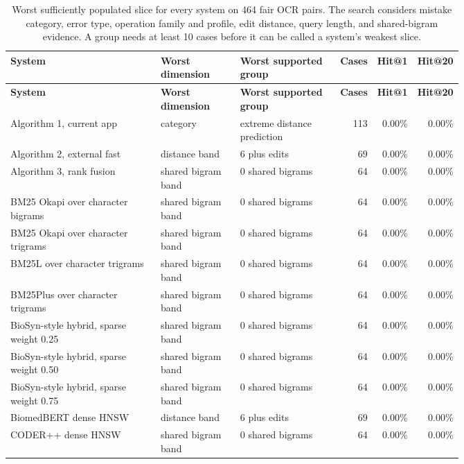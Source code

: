 \begin{scriptsize}
\setlength{\tabcolsep}{1.5pt}
\renewcommand{\arraystretch}{1.05}
\begin{longtable}{@{}L{0.35\linewidth}L{0.18\linewidth}L{0.23\linewidth}rrr@{}}
\caption{Worst sufficiently populated slice for every system on 464 fair OCR pairs. The search considers mistake category, error type, operation family and profile, edit distance, query length, and shared-bigram evidence. A group needs at least 10 cases before it can be called a system's weakest slice.}\label{tab:expanded-ocr-weakest-slice}\\
\toprule
\textbf{System} & \textbf{Worst dimension} & \textbf{Worst supported group} & \textbf{Cases} & \textbf{Hit@1} & \textbf{Hit@20} \\
\midrule
\endfirsthead
\toprule
\textbf{System} & \textbf{Worst dimension} & \textbf{Worst supported group} & \textbf{Cases} & \textbf{Hit@1} & \textbf{Hit@20} \\
\midrule
\endhead
Algorithm 1, current app & category & extreme distance prediction & 113 & 0.00\% & 0.00\% \\
Algorithm 2, external fast & distance band & 6 plus edits & 69 & 0.00\% & 0.00\% \\
Algorithm 3, rank fusion & shared bigram band & 0 shared bigrams & 64 & 0.00\% & 0.00\% \\
BM25 Okapi over character bigrams & shared bigram band & 0 shared bigrams & 64 & 0.00\% & 0.00\% \\
BM25 Okapi over character trigrams & shared bigram band & 0 shared bigrams & 64 & 0.00\% & 0.00\% \\
BM25L over character trigrams & shared bigram band & 0 shared bigrams & 64 & 0.00\% & 0.00\% \\
BM25Plus over character trigrams & shared bigram band & 0 shared bigrams & 64 & 0.00\% & 0.00\% \\
BioSyn-style hybrid, sparse weight 0.25 & shared bigram band & 0 shared bigrams & 64 & 0.00\% & 0.00\% \\
BioSyn-style hybrid, sparse weight 0.50 & shared bigram band & 0 shared bigrams & 64 & 0.00\% & 0.00\% \\
BioSyn-style hybrid, sparse weight 0.75 & shared bigram band & 0 shared bigrams & 64 & 0.00\% & 0.00\% \\
BiomedBERT dense HNSW & distance band & 6 plus edits & 69 & 0.00\% & 0.00\% \\
CODER++ dense HNSW & shared bigram band & 0 shared bigrams & 64 & 0.00\% & 0.00\% \\

\end{longtable}
\end{scriptsize}

